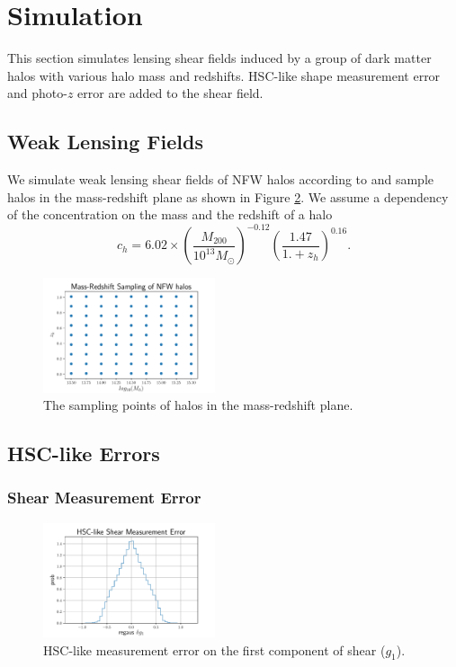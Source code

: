 \documentclass[twocolumn]{aastex62}
\begin{document}
\section{Simulation}
\label{sec:Sim}
This section simulates lensing shear fields induced by a group of dark matter halos with various halo mass and redshifts.
HSC-like shape measurement error and photo-$z$ error are added to the shear field.

\subsection{Weak Lensing Fields}

We simulate weak lensing shear fields of NFW halos according to \citet{haloModel-TJ2003-3pt} 
and sample halos in the mass-redshift plane as shown in Figure \ref{fig:mass-redshift}.
We assume a dependency of the concentration on the mass and the redshift of a halo 
\begin{equation}
c_{h}=6.02\times(\frac{M_{200}}{10^{13} M_{\odot}})^{-0.12}(\frac{1.47}{1.+z_h})^{0.16}.
\end{equation}


\begin{figure}[!ht]
 \centering
 \includegraphics[width=0.45\textwidth]{mass-redshift-sampling.pdf}
 \caption{The sampling points of halos in the mass-redshift plane.}
 \label{fig:mass-redshift}
\end{figure}

\subsection{HSC-like Errors}
\subsubsection{Shear Measurement Error}
\begin{figure}[!ht]
 \centering
 \includegraphics[width=0.45\textwidth]{shapeMeasurementError-HSCY1.pdf}
 \caption{HSC-like measurement error on the first component of shear ($g_1$).}
 \label{fig:mass-redshift}
\end{figure}
\end{document}
